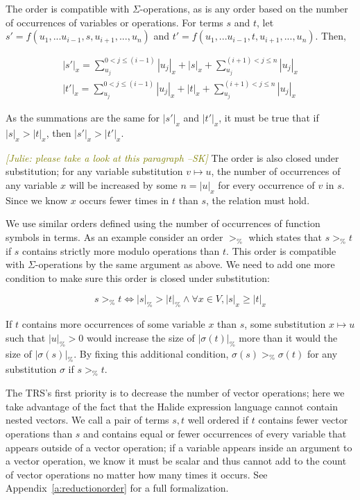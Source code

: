 \documentclass[sigplan,10pt,review,anonymous]{acmart}\settopmatter{printfolios=true,printccs=false,printacmref=false}
\newcommand{\sak}[1]{\textcolor{olive}{\textit{[{#1} --SK]}}}
\begin{document}
The order is compatible with $\Sigma$-operations, as is any order based on the number of occurrences of variables or operations. For terms $s$ and $t$, let $s' = f(u_1,...u_{i-1},s,u_{i+1},...,u_n)$ and $t' = f(u_1,...u_{i-1},t,u_{i+1},...,u_n)$. Then, 

\begin{gather*}
|s'|_x = \sum_{u_j}^{0<j \leq (i-1)} |u_j|_x + |s|_x + \sum_{u_j}^{(i+1)<j \leq n} |u_j|_x \\
|t'|_x = \sum_{u_j}^{0<j \leq (i-1)} |u_j|_x + |t|_x + \sum_{u_j}^{(i+1)<j \leq n} |u_j|_x
\end{gather*}

As the summations are the same for $|s'|_x$ and $|t'|_x$, it must be true that if $|s|_x > |t|_x$, then $|s'|_x > |t'|_x$.

\sak{Julie: please take a look at this paragraph} The order is also closed under substitution; for any variable substitution
$v \mapsto u$, the number of occurrences of any variable $x$ will be increased
by some $n = |u|_x$ for every occurrence of $v$ in $s$. Since we know $x$ occurs
fewer times in $t$ than $s$, the relation must hold.

We use similar orders defined using the number of occurrences of function symbols in terms. As an example consider an order $>_{\texttt{\%}}$ which states that $s >_{\texttt{\%}} t$ if $s$ contains strictly more modulo operations than $t$. This order is compatible with $\Sigma$-operations by the same argument as above. We need to add one more condition to make sure this order is closed under substitution:

\begin{equation*}
s >_{\texttt{\%}} t \iff |s|_{\texttt{\%}} > |t|_{\texttt{\%}} \wedge \forall x \in V, |s|_x \geq |t|_x
\end{equation*}

If $t$ contains more occurrences of some variable $x$ than $s$, some substitution $x \mapsto u$ such that $|u|_{\texttt{\%}} > 0$ would increase the size of $|\sigma(t)|_{\texttt{\%}}$ more than it would the size of $|\sigma(s)|_{\texttt{\%}}$. By fixing this additional condition, $\sigma(s) >_{\texttt{\%}} \sigma(t)$ for any substitution $\sigma$ if $s >_{\texttt{\%}} t$.

The TRS's first priority is to decrease the number of vector operations; here we take advantage of the fact that the Halide expression language cannot contain nested vectors. We call a pair of terms $s, t$ well ordered if $t$ contains fewer vector operations than $s$ and contains equal or fewer occurrences of every variable that appears outside of a vector operation; if a variable appears inside an argument to a vector operation, we know it must be scalar and thus cannot add to the count of vector operations no matter how many times it occurs. See Appendix~\ref{a:reductionorder} for a full formalization.
\end{document}
